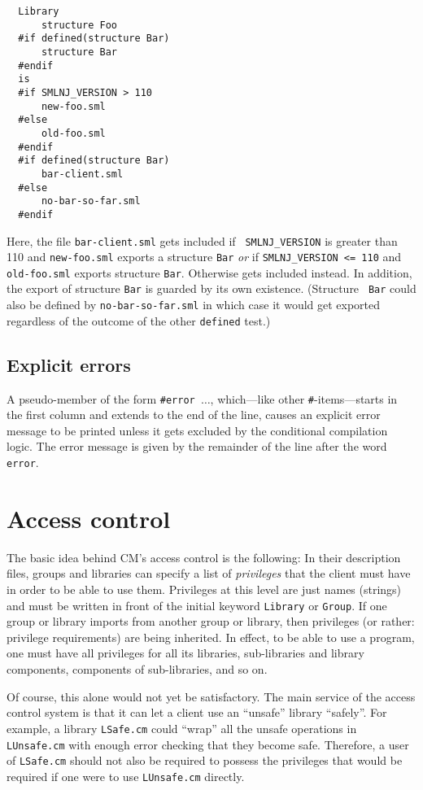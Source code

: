 \documentclass[titlepage,letterpaper]{article}
\begin{document}
\begin{verbatim}
  Library
      structure Foo
  #if defined(structure Bar)
      structure Bar
  #endif
  is
  #if SMLNJ_VERSION > 110
      new-foo.sml
  #else
      old-foo.sml
  #endif
  #if defined(structure Bar)
      bar-client.sml
  #else
      no-bar-so-far.sml
  #endif
\end{verbatim}

Here, the file {\tt bar-client.sml} gets included if {\tt
SMLNJ\_VERSION} is greater than 110 and {\tt new-foo.sml} exports a
structure {\tt Bar} {\em or} if {\tt SMLNJ\_VERSION <= 110} and {\tt
old-foo.sml} exports structure {\tt Bar}.  Otherwise gets included instead.  In addition, the export of
structure {\tt Bar} is guarded by its own existence.  (Structure {\tt
Bar} could also be defined by {\tt no-bar-so-far.sml} in
which case it would get exported regardless of the outcome of the
other {\tt defined} test.)

\subsection{Explicit errors}

A pseudo-member of the form {\tt \#error $\ldots$}, which---like other
{\tt \#}-items---starts in the first column and extends to the end of
the line, causes an explicit error message to be printed unless it
gets excluded by the conditional compilation logic.  The error message
is given by the remainder of the line after the word {\tt error}.

\section{Access control}
\label{sec:access}

The basic idea behind CM's access control is the following: In their
description files, groups and libraries can specify a list of
{\em privileges} that the client must have in order to be able to use them.
Privileges at this level are just names (strings) and must be written
in front of the initial keyword {\tt Library} or {\tt Group}.  If one
group or library imports from another group or library, then
privileges (or rather: privilege requirements) are being inherited.
In effect, to be able to use a program, one must have all privileges
for all its libraries, sub-libraries and library components,
components of sub-libraries, and so on.

Of course, this alone would not yet be satisfactory.  The main service
of the access control system is that it can let a client use an
``unsafe'' library ``safely''.  For example, a library {\tt LSafe.cm}
could ``wrap'' all the unsafe operations in {\tt LUnsafe.cm} with
enough error checking that they become safe.  Therefore, a user of
{\tt LSafe.cm} should not also be required to possess the privileges
that would be required if one were to use {\tt LUnsafe.cm} directly.
\end{document}
